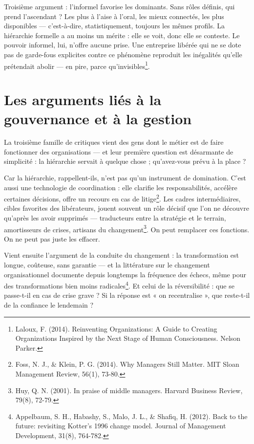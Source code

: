 Troisième argument : l'informel favorise les dominants. Sans rôles définis, qui prend l'ascendant ? Les plus à l'aise à l'oral, les mieux connectés, les plus disponibles — c'est-à-dire, statistiquement, toujours les mêmes profils. La hiérarchie formelle a au moins un mérite : elle se voit, donc elle se conteste. Le pouvoir informel, lui, n'offre aucune prise. Une entreprise libérée qui ne se dote pas de garde-fous explicites contre ce phénomène reproduit les inégalités qu'elle prétendait abolir — en pire, parce qu'invisibles\footnote{Laloux, F. (2014). Reinventing Organizations: A Guide to Creating Organizations Inspired by the Next Stage of Human Consciousness. Nelson Parker.}.

\section{Les arguments liés à la gouvernance et à la gestion}

La troisième famille de critiques vient des gens dont le métier est de faire fonctionner des organisations — et leur première question est désarmante de simplicité : la hiérarchie servait à quelque chose ; qu'avez-vous prévu à la place ?

Car la hiérarchie, rappellent-ils, n'est pas qu'un instrument de domination. C'est aussi une technologie de coordination : elle clarifie les responsabilités, accélère certaines décisions, offre un recours en cas de litige\footnote{Foss, N. J., \& Klein, P. G. (2014). Why Managers Still Matter. MIT Sloan Management Review, 56(1), 73-80.}. Les cadres intermédiaires, cibles favorites des libérateurs, jouent souvent un rôle décisif que l'on ne découvre qu'après les avoir supprimés — traducteurs entre la stratégie et le terrain, amortisseurs de crises, artisans du changement\footnote{Huy, Q. N. (2001). In praise of middle managers. Harvard Business Review, 79(8), 72-79.}. On peut remplacer ces fonctions. On ne peut pas juste les effacer.

Vient ensuite l'argument de la conduite du changement : la transformation est longue, coûteuse, sans garantie — et la littérature sur le changement organisationnel documente depuis longtemps la fréquence des échecs, même pour des transformations bien moins radicales\footnote{Appelbaum, S. H., Habashy, S., Malo, J. L., \& Shafiq, H. (2012). Back to the future: revisiting Kotter's 1996 change model. Journal of Management Development, 31(8), 764-782.}. Et celui de la réversibilité : que se passe-t-il en cas de crise grave ? Si la réponse est « on recentralise », que reste-t-il de la confiance le lendemain ?

